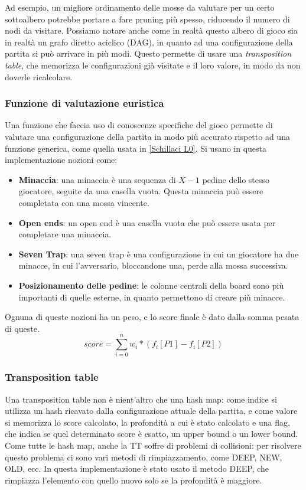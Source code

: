 Ad esempio, un migliore ordinamento delle mosse da valutare per un certo sottoalbero potrebbe portare a fare pruning più spesso, riducendo il numero di nodi da visitare.
Possiamo notare anche come in realtà questo albero di gioco sia in realtà un grafo diretto aciclico (DAG), in quanto ad una configurazione della partita si può arrivare in più modi. Questo permette di usare una \textit{transposition table}, che memorizza le configurazioni già visitate e il loro valore, in modo da non doverle ricalcolare.

\subsubsection{Funzione di valutazione euristica}

Una funzione che faccia uso di conoscenze specifiche del gioco permette di valutare una configurazione della partita in modo più accurato rispetto ad una funzione generica, come quella usata in \ref{Schillaci L0}.
Si usano in questa implementazione nozioni come:
\begin{itemize}
    \item \textbf{Minaccia}: una minaccia è una sequenza di $X-1$ pedine dello stesso giocatore, seguite da una casella vuota. Questa minaccia può essere completata con una mossa vincente.
    \item \textbf{Open ends}: un open end è una casella vuota che può essere usata per completare una minaccia.
    \item \textbf{Seven Trap}: una seven trap è una configurazione in cui un giocatore ha due minacce, in cui l'avversario, bloccandone una, perde alla mossa successiva.
    \item \textbf{Posizionamento delle pedine}: le colonne centrali della board sono più importanti di quelle esterne, in quanto permettono di creare più minacce.
\end{itemize}

Ognuna di queste nozioni ha un peso, e lo score finale è dato dalla somma pesata di queste.
$$
    score = \sum_{i=0}^{n} w_i * (f_i[P1] - f_i[P2])
$$

\subsubsection{Transposition table}

Una transposition table non è nient'altro che una hash map: come indice si utilizza un hash ricavato dalla configurazione attuale della partita, e come valore si memorizza lo score calcolato, la profondità a cui è stato calcolato e una flag, che indica se quel determinato score è esatto, un upper bound o un lower bound.
Come tutte le hash map, anche la TT soffre di problemi di collisioni: per risolvere questo problema ci sono vari metodi di rimpiazzamento, come DEEP, NEW, OLD, ecc. In questa implementazione è stato usato il metodo DEEP, che rimpiazza l'elemento con quello nuovo solo se la profondità è maggiore.

